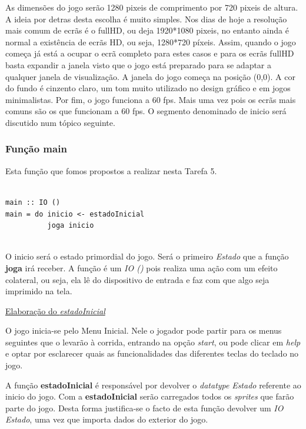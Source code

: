 \documentclass[a4paper]{report} %
\begin{document}
As dimensões do jogo serão 1280 pixeis de comprimento por 720 pixeis de altura. A ideia por detras desta escolha é muito simples. Nos dias de hoje a resolução mais comum de ecrãs é o fullHD, ou deja 1920*1080 pixeis, no entanto ainda é normal a existência de ecrãs HD, ou seja, 1280*720 píxeis. Assim, quando o jogo começa já está a ocupar o ecrã completo para estes casos e para os ecrãs fullHD basta expandir a janela visto que o jogo está preparado para se adaptar a qualquer janela de visualização.  A janela do jogo começa na posição (0,0). A cor do fundo é cinzento claro, um tom muito utilizado no design gráfico e em jogos minimalistas. Por fim, o jogo funciona a 60 fps. Mais uma vez pois os ecrãs mais comuns são os que funcionam a 60 fps. O segmento denominado de inicio será discutido num tópico seguinte.


\subsubsection{Função \textbf{main}}

Esta função que fomos propostos a realizar nesta Tarefa 5.

\begin{verbatim}

main :: IO ()
main = do inicio <- estadoInicial
          joga inicio


\end{verbatim}

O inicio será o estado primordial do jogo. Será o primeiro \emph{Estado} que a função \textbf{joga} irá receber. A função é um \emph{IO ()} pois realiza uma ação com um efeito colateral, ou seja,  ela lê do dispositivo de entrada e faz com que algo seja imprimido na tela.

\newpage

\maketitle\underline{Elaboração do \emph{estadoInicial}}

O jogo inicia-se pelo Menu Inicial. Nele o jogador pode partir para os menus seguintes que o levarão à corrida, entrando na opção \textit{start}, ou pode clicar em \textit{help} e optar por esclarecer quais as funcionalidades das diferentes teclas do teclado no jogo.

A função \textbf{estadoInicial} é responsável por devolver o \textit{datatype} \emph{Estado} referente ao inicio do jogo. Com a \textbf{estadoInicial} serão carregados todos os \textit{sprites} que farão parte do jogo. Desta forma justifica-se o facto de esta função devolver um \emph{IO Estado}, uma vez que importa dados do exterior do jogo.
\end{document}
